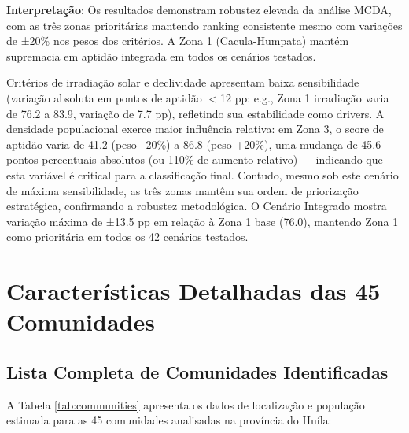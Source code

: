\documentclass[12pt, a4paper]{article}
\begin{document}
\textbf{Interpretação}: Os resultados demonstram robustez elevada da análise MCDA, com as três zonas prioritárias mantendo ranking consistente mesmo com variações de ±20\% nos pesos dos critérios. A Zona 1 (Cacula-Humpata) mantém supremacia em aptidão integrada em todos os cenários testados. 

Critérios de irradiação solar e declividade apresentam baixa sensibilidade (variação absoluta em pontos de aptidão $<$12 pp: e.g., Zona 1 irradiação varia de 76.2 a 83.9, variação de 7.7 pp), refletindo sua estabilidade como drivers. A densidade populacional exerce maior influência relativa: em Zona 3, o score de aptidão varia de 41.2 (peso –20\%) a 86.8 (peso +20\%), uma mudança de 45.6 pontos percentuais absolutos (ou 110\% de aumento relativo) — indicando que esta variável é critical para a classificação final. Contudo, mesmo sob este cenário de máxima sensibilidade, as três zonas mantêm sua ordem de priorização estratégica, confirmando a robustez metodológica. O Cenário Integrado mostra variação máxima de ±13.5 pp em relação à Zona 1 base (76.0), mantendo Zona 1 como prioritária em todos os 42 cenários testados.

\section{Características Detalhadas das 45 Comunidades}

\subsection{Lista Completa de Comunidades Identificadas}

A Tabela \ref{tab:communities} apresenta os dados de localização e população estimada para as 45 comunidades analisadas na província do Huíla:
\end{document}
